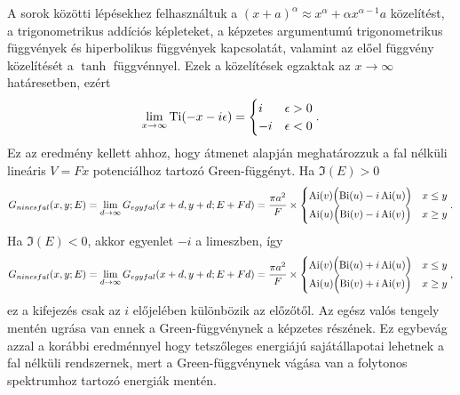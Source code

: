 A sorok közötti lépésekhez felhasználtuk a $(x+a)^\alpha\approx x^\alpha + \alpha x^{\alpha-1}a$ közelítést, a trigonometrikus addíciós képleteket, a képzetes argumentumú trigonometrikus függvények és hiperbolikus függvények kapcsolatát, valamint az előel függvény közelítését a $\tanh$ függvénnyel. Ezek a közelítések egzaktak az $x\to\infty$ határesetben, ezért
\begin{equation}
	\lim_{x\to\infty}\operatorname{Ti}(-x-i\epsilon)=
	\begin{cases}
		i &\epsilon > 0\\
		-i&\epsilon < 0
	\end{cases}.
	\label{limits:ti}
\end{equation}
Ez az eredmény kellett ahhoz, hogy  átmenet alapján meghatározzuk a fal nélküli lineáris $V=Fx$ potenciálhoz tartozó Green-függényt. Ha $\Im(E)>0$
\begin{dmath}
	G_{nincs fal}(x,y;E)=\lim_{d\to\infty}G_{egy fal}(x+d,y+d;E+Fd)=\frac{\pi a^2}{F}\times
	\begin{cases}
		\Ai(v)\Bigl(\Bi(u)-i\Ai(u)\Bigr)&x\leq y\\
		\Ai(u)\Bigl(\Bi(v)-i\Ai(v)\Bigr)&x\geq y
	\end{cases}.
	\label{limits:nowallgreen1}
\end{dmath}
Ha $\Im(E)<0$, akkor  egyenlet $-i$ a limeszben, így
\begin{dmath}
	G_{nincs fal}(x,y;E)=\lim_{d\to\infty}G_{egy fal}(x+d,y+d;E+Fd)=\frac{\pi a^2}{F}\times
	\begin{cases}
		\Ai(v)\Bigl(\Bi(u)+i\Ai(u)\Bigr)&x\leq y\\
		\Ai(u)\Bigl(\Bi(v)+i\Ai(v)\Bigr)&x\geq y
	\end{cases},
	\label{limits:nowallgreen2}
\end{dmath}
ez a kifejezés csak az $i$ előjelében különbözik az előzőtől. Az egész valós tengely mentén ugrása van ennek a Green-függvénynek a képzetes részének. Ez egybevág azzal a korábbi eredménnyel hogy tetszőleges energiájú sajátállapotai lehetnek a fal nélküli rendszernek, mert a Green-függvénynek vágása van a folytonos spektrumhoz tartozó energiák mentén.











